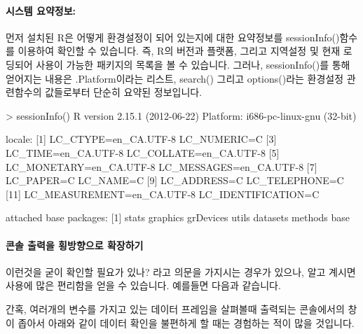 \paragraph{시스템 요약정보:} 먼저 설치된 R은 어떻게 환경설정이 되어 있는지에 대한 요약정보를 sessionInfo()함수를 이용하여 확인할 수 있습니다.
즉, R의 버전과 플랫폼, 그리고 지역설정 및 현재 로딩되어 사용이 가능한 패키지의 목록을 볼 수 있습니다. 
그러나, sessionInfo()를 통해 얻어지는 내용은 .Platform이라는 리스트, search() 그리고 options()라는 환경설정 관련함수의 값들로부터 단순히 요약된 정보입니다. 

\begin{Schunk}
\begin{Soutput}
> sessionInfo()
R version 2.15.1 (2012-06-22)
Platform: i686-pc-linux-gnu (32-bit)

locale:
 [1] LC_CTYPE=en_CA.UTF-8       LC_NUMERIC=C              
 [3] LC_TIME=en_CA.UTF-8        LC_COLLATE=en_CA.UTF-8    
 [5] LC_MONETARY=en_CA.UTF-8    LC_MESSAGES=en_CA.UTF-8   
 [7] LC_PAPER=C                 LC_NAME=C                 
 [9] LC_ADDRESS=C               LC_TELEPHONE=C            
[11] LC_MEASUREMENT=en_CA.UTF-8 LC_IDENTIFICATION=C       

attached base packages:
[1] stats     graphics  grDevices utils     datasets  methods   base     
\end{Soutput}
\end{Schunk}

\paragraph{콘솔 출력을 횡방향으로 확장하기} 
이런것을 굳이 확인할 필요가 있나? 라고 의문을 가지시는 경우가 있으나, 알고 계시면 사용에 많은 편리함을 얻을 수 있습니다.
예를들면 다음과 같습니다.

간혹, 여러개의 변수를 가지고 있는 데이터 프레임을 살펴볼때 출력되는 콘솔에서의 창이 좁아서 아래와 같이 데이터 확인을 불편하게 할 때는 경험하는 적이 많을 것입니다. 

\begin{Schunk}
\end{Schunk}

